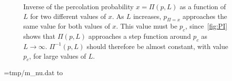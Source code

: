 \documentclass[11pt,british,a4paper]{report}
\begin{document}
\begin{figure}[H]
    \centering
    \caption{Inverse of the percolation probability \(x = \Pi(p,L)\) as a function of \(L\) for two different values of \(x\). As \(L\) increases, \(p_{\Pi=x}\) approaches the same value for both values of \(x\). This value must be \(p_c\), since~\vref{fig:PI} shows that \(\Pi(p,L)\) approaches a step function around \(p_c\) as \(L\to\infty\). \(\Pi^{-1}(p,L)\) should therefore be almost constant, with value \(p_c\), for large values of \(L\).}%
    \label{fig:l}
\end{figure}


%
\openin\infile=tmp/m_nu.dat
\read\infile to \mynu
\closein\infile
\end{document}
